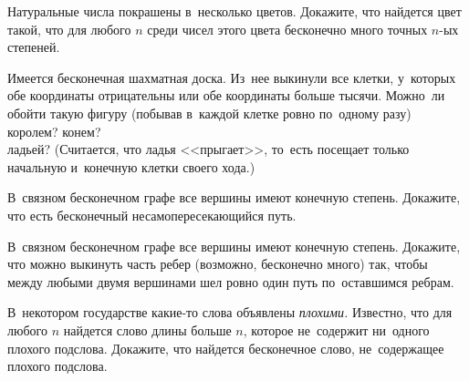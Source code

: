 


\begin{problems}

\item
Натуральные числа покрашены в~несколько цветов.
Докажите, что найдется цвет такой, что для любого $n$ среди чисел этого цвета
бесконечно много точных $n$-ых степеней.

\item
Имеется бесконечная шахматная доска.
Из~нее выкинули все клетки, у~которых обе координаты отрицательны или обе
координаты больше тысячи.
Можно~ли обойти такую фигуру (побывав в~каждой клетке ровно по~одному разу)
\\
\subproblem королем?
\qquad
\subproblem конем?
\\
\subproblem ладьей?\enspace
(Считается, что ладья <<прыгает>>, то~есть посещает только начальную и~конечную
клетки своего хода.)

\item
В~связном бесконечном графе все вершины имеют конечную степень.
Докажите, что есть бесконечный несамопересекающийся путь.

\item
В~связном бесконечном графе все вершины имеют конечную степень.
Докажите, что можно выкинуть часть ребер (возможно, бесконечно много) так,
чтобы между любыми двумя вершинами шел ровно один путь по~оставшимся ребрам.

\item
В~некотором государстве какие-то слова объявлены \emph{плохими.}
Известно, что для любого $n$ найдется слово длины больше $n$, которое
не~содержит ни~одного плохого подслова.
Докажите, что найдется бесконечное слово, не~содержащее плохого подслова.

\end{problems}


